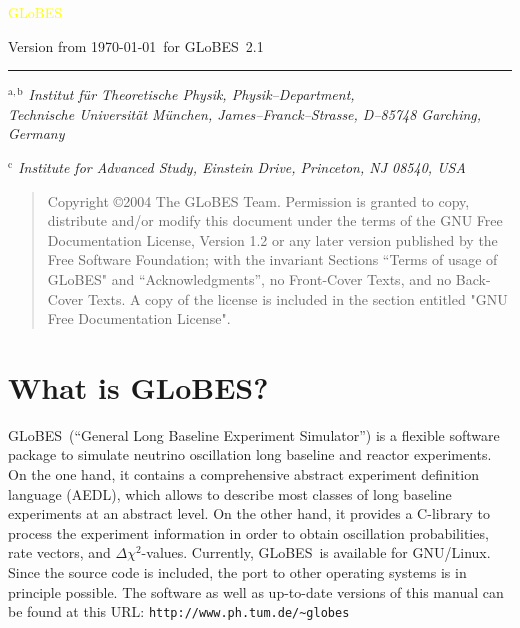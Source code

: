 \documentclass[a4paper,12pt,twoside]{book}
\newcommand{\GLOBES}{{\sf GLoBES}}
\begin{document}
{\begin{center}
\vspace*{-1cm}

{\Huge \textcolor{yellow}{GLoBES}}
\end{center}

\vspace{1cm}

\begin{center}
Version from \today\ for \GLOBES\ 2.1
\end{center}


\vspace*{0.5cm}
\vfill
\hrule

{\em\small $^{\mathrm{a},\mathrm{b}}$%
       Institut f\"ur Theoretische Physik, Physik--Department,\\
       Technische Universit\"at M\"unchen,
       James--Franck--Strasse, D--85748 Garching, Germany}

{\em\small $^{\mathrm{c}}$%
       Institute for Advanced Study, 
       Einstein Drive, Princeton, NJ 08540, USA}



}


\clearpage
\thispagestyle{empty}
\bigskip
\begin{quote}
    Copyright \copyright  2004  The GLoBES Team.
    Permission is granted to copy, distribute and/or modify this document
    under the terms of the GNU Free Documentation License, Version 1.2
    or any later version published by the Free Software Foundation;
    with the invariant Sections ``Terms of usage of \GLOBES" 
    and ``Acknowledgments'', no Front-Cover Texts, and no Back-Cover Texts.
    A copy of the license is included in the section entitled "GNU
    Free Documentation License".
\end{quote}
\bigskip
    


\cleardoublepage
\setcounter{page}{1}

\chapter*{What is \GLOBES ?}

\vspace*{-4ex}
\GLOBES\ (``General Long Baseline Experiment Simulator'') is a flexible
software package to simulate neutrino oscillation 
long baseline and reactor experiments. On the
one hand, it contains a comprehensive abstract experiment definition
language (AEDL), which allows to describe most classes 
of long baseline experiments
at an abstract level. On the other hand, it provides a C-library to 
process the experiment information in order to obtain oscillation
probabilities, rate vectors, and $\Delta \chi^2$-values. Currently, 
\GLOBES\ is available for GNU/Linux. Since the source code is included,
the port to other operating systems is in principle possible. The software
as well as up-to-date versions of this manual can be found at this URL:
 \verb+http://www.ph.tum.de/~globes+
\end{document}
